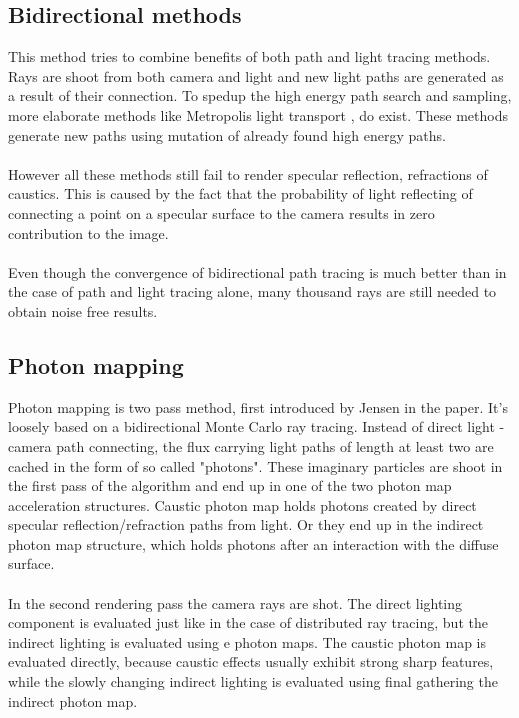 \subsection{Bidirectional methods}
This method tries to combine benefits of both path and light tracing methods. Rays are shoot from both camera and light and new light paths are generated as a result of their connection. To spedup the high energy path search and sampling, more elaborate methods like Metropolis light transport \cite{Veach97metropolislight}, do exist. These methods generate new paths using mutation of already found high energy paths.
\\
\\
However all these methods still fail to render specular reflection, refractions of caustics. This is caused by the fact that the probability of light reflecting of connecting a point on a specular surface to the camera results in zero contribution to the image.
\\
\\
Even though the convergence of bidirectional path tracing is much better than in the case of path and light tracing alone, many thousand rays are still needed to obtain noise free results.




\subsection{Photon mapping}
Photon mapping is two pass method, first introduced by Jensen in the \cite{Jensen:1996} paper. It's loosely based on a bidirectional Monte Carlo ray tracing. Instead of direct light - camera path connecting, the flux carrying light paths of length at least two are cached in the form of so called "photons". These imaginary particles are shoot in the first pass of the algorithm and end up in one of the two photon map acceleration structures. Caustic photon map holds photons created by direct specular reflection/refraction paths from light. Or they end up in the indirect photon map structure, which holds photons after an interaction with the diffuse surface.
\\
\\
In the second rendering pass the camera rays are shot. The direct lighting component is
evaluated just like in the case of distributed ray tracing, but the indirect lighting is evaluated
using e photon maps. The caustic photon map is evaluated directly, because caustic effects
usually exhibit strong sharp features, while the slowly changing indirect lighting is evaluated
using final gathering the indirect photon map.


